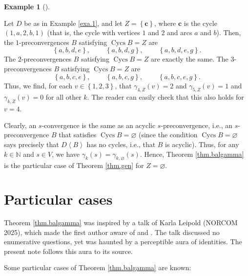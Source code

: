 \documentclass[numbers=enddot,12pt,final,onecolumn,notitlepage]{scrartcl}%
\theoremstyle{definition}
\newtheorem{exam}[theo]{Example}
\newenvironment{example}[1][]
{\begin{exam}[#1]\begin{leftbar}}
{\end{leftbar}\end{exam}}
\theoremstyle{plainsl}
\begin{document}
\begin{example}
\label{exa.1Z}Let $D$ be as in Example \ref{exa.1}, and let $Z=\left\{
\mathbf{c}\right\}  $, where $\mathbf{c}$ is the cycle $\left(
1,a,2,b,1\right)  $ (that is, the cycle with vertices $1$ and $2$ and arcs $a$
and $b$). Then, the $1$-preconvergences $B$ satisfying $\operatorname*{Cycs}%
B=Z$ are%
\[
\left\{  a,b,d,e\right\}  ,\ \ \ \ \ \ \ \ \ \ \left\{  a,b,d,g\right\}
,\ \ \ \ \ \ \ \ \ \ \left\{  a,b,d,e,g\right\}  .
\]
The $2$-preconvergences $B$ satisfying $\operatorname*{Cycs}B=Z$ are exactly
the same. The $3$-preconvergences $B$ satisfying $\operatorname*{Cycs}B=Z$
are
\[
\left\{  a,b,c,e\right\}  ,\ \ \ \ \ \ \ \ \ \ \left\{  a,b,c,g\right\}
,\ \ \ \ \ \ \ \ \ \ \left\{  a,b,c,e,g\right\}  .
\]
Thus, we find, for each $v\in\left\{  1,2,3\right\}  $, that $\gamma
_{4,Z}\left(  v\right)  =2$ and $\gamma_{5,Z}\left(  v\right)  =1$ and
$\gamma_{k,Z}\left(  v\right)  =0$ for all other $k$. The reader can easily
check that this also holds for $v=4$.
\end{example}

Clearly, an $s$-convergence is the same as an acyclic $s$-preconvergence,
i.e., an $s$-preconvergence $B$ that satisfies $\operatorname*{Cycs}%
B=\varnothing$ (since the condition $\operatorname*{Cycs}B=\varnothing$ says
precisely that $D\left\langle B\right\rangle $ has no cycles, i.e., that $B$
is acyclic). Thus, for any $k\in\mathbb{N}$ and $s\in V$, we have $\gamma
_{k}\left(  s\right)  =\gamma_{k,\varnothing}\left(  s\right)  $. Hence,
Theorem \ref{thm.balgamma} is the particular case of Theorem \ref{thm.gen} for
$Z=\varnothing$.

\section{\label{sec.partic}Particular cases}

Theorem \ref{thm.balgamma} was inspired by a talk of Karla Leipold (NORCOM
2025), which made the first author aware of \cite[Lemma 4.1]{LeiVal24} and
\cite[\S 3.1]{PerPha15}. The talk discussed no enumerative questions, yet was
haunted by a perceptible aura of identities. The present note follows this
aura to its source.

Some particular cases of Theorem \ref{thm.balgamma} are known:
\end{document}
